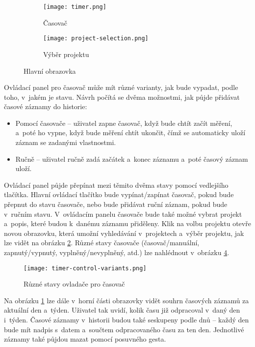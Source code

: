 \begin{figure}[h]
    \centering
    \begin{subfigure}[b]{0.4\textwidth}
		\centering
		\texttt{[image: timer.png]}
		\caption{Časovač}
		\label{fig:timer}
	\end{subfigure}
	\hspace{2cm}
	\begin{subfigure}[b]{0.4\textwidth}
		\centering
		\texttt{[image: project-selection.png]}
		\caption{Výběr projektu}
		\label{fig:project-selection}
	\end{subfigure}
	\caption{Hlavní obrazovka}
	\label{fig:timer-and-project-selection}
\end{figure}

Ovládací panel pro časovač může mít různé varianty, jak bude vypadat, podle toho, v~jakém je stavu. Návrh počítá se dvěma možnostmi, jak půjde přidávat časové záznamy do historie:
\begin{itemize}
\item Pomocí časovače – uživatel zapne časovač, když bude chtít začít měření, a~poté ho vypne, když bude měření chtít ukončit, čímž se automaticky uloží záznam se zadanými vlastnostmi.
\item Ručně – uživatel ručně zadá začátek a~konec záznamu a~poté časový záznam uloží.
\end{itemize}
Ovládací panel půjde přepínat mezi těmito dvěma stavy pomocí vedlejšího tlačítka. Hlavní ovládací tlačítko bude vypínat/zapínat časovač, pokud bude přepnut do stavu časovače, nebo bude přidávat ruční záznam, pokud bude v~ručním stavu. V~ovládacím panelu časovače bude také možné vybrat projekt a~popis, které budou k~danému záznamu přiděleny. Klik na volbu projektu otevře novou obrazovku, která umožní vyhledávání v~projektech a~výběr projektu, jak lze vidět na obrázku \ref{fig:project-selection}. Různé stavy časovače (časovač/manuální, zapnutý/vypnutý, vyplněný/nevyplněný, atd.) lze nahlédnout v~obrázku \ref{fig:timer-control-variants}.

\begin{figure}[h]
	\centering
	\texttt{[image: timer-control-variants.png]}
	\caption{Různé stavy ovladače pro časovač}
	\label{fig:timer-control-variants}
\end{figure}

Na obrázku \ref{fig:timer} lze dále v~horní části obrazovky vidět souhrn časových záznamů za aktuální den a~týden. Uživatel tak uvidí, kolik času již odpracoval v~daný den i~týden. Časové záznamy v~historii budou také seskupeny podle dnů – každý den bude mít nadpis s~datem a~součtem odpracovaného času za ten den. Jednotlivé záznamy také půjdou mazat pomocí posuvného gesta.

